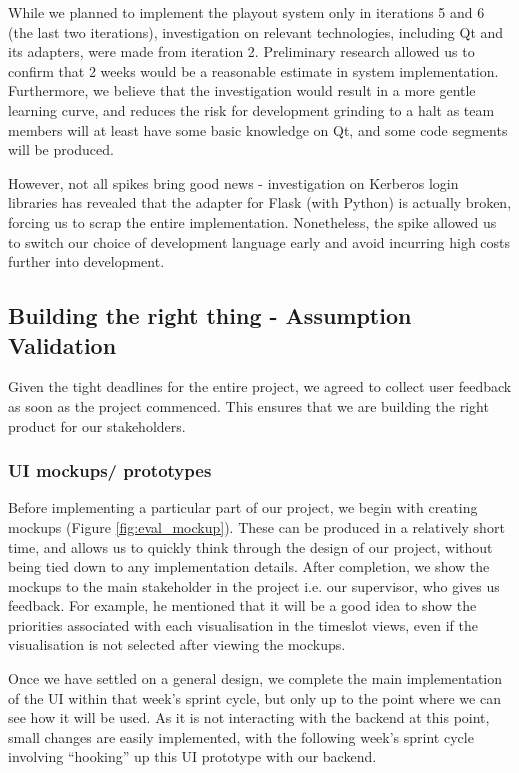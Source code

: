 \documentclass[a4paper, titlepage]{article}
\begin{document}
While we planned to implement the playout system only in iterations 5 and 6 (the last two iterations), investigation on relevant technologies, including Qt and its adapters, were made from iteration 2. Preliminary research allowed us to confirm that 2 weeks would be a reasonable estimate in system implementation. Furthermore, we believe that the investigation would result in a more gentle learning curve, and reduces the risk for development grinding to a halt as team members will at least have some basic knowledge on Qt, and some code segments will be produced.

However, not all spikes bring good news - investigation on Kerberos login libraries has revealed that the adapter for Flask (with Python) is actually broken, forcing us to scrap the entire implementation. Nonetheless, the spike allowed us to switch our choice of development language early and avoid incurring high costs further into development.

\subsection{Building the right thing - Assumption Validation} \label{sec:eval_validation}

Given the tight deadlines for the entire project, we agreed to collect
user feedback as soon as the project commenced. This ensures that we are building the right product for our stakeholders.

\subsubsection{UI mockups/ prototypes} \label{sec:eval_uimockup}

Before implementing a particular part of our project, we begin with creating mockups (Figure \ref{fig:eval_mockup}). These can be produced in a relatively short time, and allows us to quickly think through the design of our project, without being tied down to any implementation details. After completion, we show the mockups to the main stakeholder in the project i.e. our supervisor, who gives us feedback. For example, he mentioned that it will be a good idea to show the priorities associated with each visualisation in the timeslot views, even if the visualisation is not selected after viewing the mockups.

Once we have settled on a general design, we complete the main implementation of the UI within that week's sprint cycle, but only up to the point where we can see how it will be used. As it is not interacting with the backend at this point, small changes are easily implemented, with the following week's sprint cycle involving ``hooking'' up this UI prototype with our backend.
\end{document}
